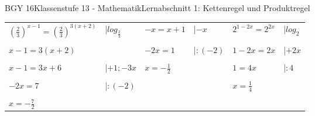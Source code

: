 \documentclass[oneside,openany,headings=optiontotoc,11pt,numbers=noenddot]{scrreprt}
\begin{document}
\begin{worksheet}{BGY 16}{Klassenstufe 13 - Mathematik}{Lernabschnitt 1: Kettenregel und Produktregel}
\begin{framed}
\begin{tabularx}{\textwidth}{Xl|Xl|Xl}
				\(\left(\frac{2}{3}\right)^{x-1} = \left(\frac{2}{3}\right)^{3(x+2)}\) & |\(log_\frac{2}{3}\) & \(-x = x+1\) & |\(-x\) & \(2^{1-2x} = 2^{2x}\) & |\(log_2\)\\
				& & & & & \\
				\(x-1 = 3(x+2)\) & & \(-2x = 1\) & |\(:(-2)\) & \(1-2x = 2x\) & |\(+2x\)\\
				& & & & & \\
				\(x-1 = 3x+6\) & |\(+1;-3x\) & \(x = -\frac{1}{2}\) & & \(1 = 4x\) & |\(:4\)\\
				& & & & & \\
				\(-2x = 7\) & |\(:(-2)\) & & & \(x = \frac{1}{4}\)\\
				& & & & & \\
				\(x = -\frac{7}{2}\) & & & & 
			\end{tabularx}
		\end{framed}
	\end{worksheet}
\end{document}

